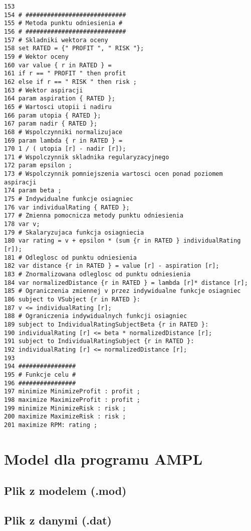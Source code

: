 \documentclass[12pt]{article}
\begin{document}
\begin{verbatim}
153
154 # ############################
155 # Metoda punktu odniesienia #
156 # ############################
157 # Skladniki wektora oceny
158 set RATED = {" PROFIT ", " RISK "};
159 # Wektor oceny
160 var value { r in RATED } =
161 if r == " PROFIT " then profit
162 else if r == " RISK " then risk ;
163 # Wektor aspiracji
164 param aspiration { RATED };
165 # Wartosci utopii i nadiru
166 param utopia { RATED };
167 param nadir { RATED };
168 # Wspolczynniki normalizujace
169 param lambda { r in RATED } =
170 1 / ( utopia [r] - nadir [r]);
171 # Wspolczynnik skladnika regularyzacyjnego
172 param epsilon ;
173 # Wspolczynnik pomniejszenia wartosci ocen ponad poziomem aspiracji
174 param beta ;
175 # Indywidualne funkcje osiagniec
176 var individualRating { RATED };
177 # Zmienna pomocnicza metody punktu odniesienia
178 var v;
179 # Skalaryzujaca funkcja osiagniecia
180 var rating = v + epsilon * (sum {r in RATED } individualRating [r]);
181 # Odleglosc od punktu odniesienia
182 var distance {r in RATED } = value [r] - aspiration [r];
183 # Znormalizowana odleglosc od punktu odniesienia
184 var normalizedDistance {r in RATED } = lambda [r]* distance [r];
185 # Ograniczenia zmiennej v przez indywidualne funkcje osiagniec
186 subject to VSubject {r in RATED }:
187 v <= individualRating [r];
188 # Ograniczenia indywidualnych funkcji osiagniec
189 subject to IndividualRatingSubjectBeta {r in RATED }:
190 individualRating [r] <= beta * normalizedDistance [r];
191 subject to IndividualRatingSubject {r in RATED }:
192 individualRating [r] <= normalizedDistance [r];
193
194 ################
195 # Funkcje celu #
196 ################
197 minimize MinimizeProfit : profit ;
198 maximize MaximizeProfit : profit ;
199 minimize MinimizeRisk : risk ;
200 maximize MaximizeRisk : risk ;
201 maximize RPM: rating ;
\end{verbatim}

\section{Model dla programu AMPL}

\subsection{Plik z modelem (.mod)}

\subsection{Plik z danymi (.dat)}
\end{document}
